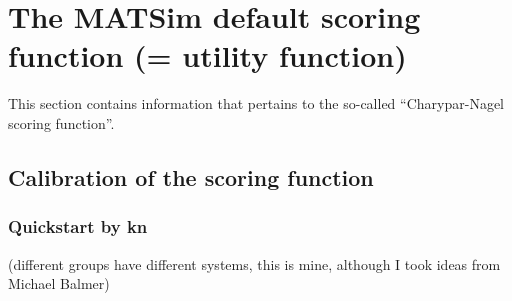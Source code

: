 \chapter{The MATSim default scoring function (= utility function)}


\bigskip




This section contains information that pertains to the so-called ``Charypar-Nagel scoring function''.

\section{Calibration of the scoring function}

\subsection{Quickstart by kn}

(different groups have different systems, this is mine, although I took ideas from Michael Balmer)

